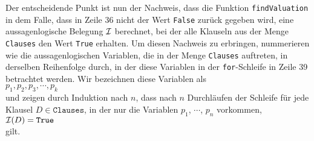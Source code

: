 Der entscheidende Punkt ist nun der Nachweis, dass die Funktion \texttt{findValuation} in dem Falle,
dass in Zeile 36 nicht der Wert \texttt{False} zurück gegeben wird, eine aussagenlogische Belegung $\mathcal{I}$ berechnet, bei der
alle Klauseln aus der Menge \texttt{Clauses} den Wert \texttt{True} erhalten.  Um diesen Nachweis zu
erbringen, nummerieren wie die aussagenlogischen Variablen, die in der Menge \texttt{Clauses}
auftreten, in derselben Reihenfolge durch, in der diese Variablen in der \texttt{for}-Schleife in Zeile
39 betrachtet werden.  Wir bezeichnen diese Variablen als
\\[0.2cm]
\hspace*{1.3cm}
 $p_1, p_2, p_3, \cdots, p_k$
\\[0.2cm]
und zeigen durch Induktion nach $n$, dass nach $n$ Durchläufen der Schleife für jede Klausel $D \in \texttt{Clauses}$, 
in der nur die Variablen $p_1$, $\cdots$, $p_n$ vorkommen, 
\\[0.2cm]
\hspace*{1.3cm}
$\mathcal{I}(D) = \texttt{True}$
\\[0.2cm]
gilt.

